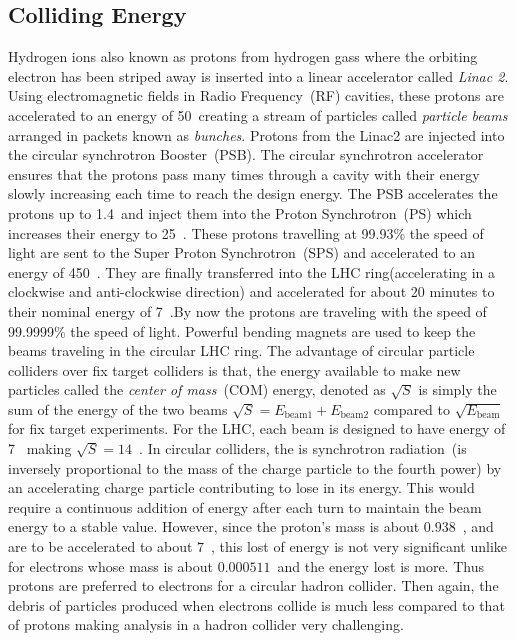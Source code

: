 \subsection{Colliding Energy}
Hydrogen ions also known as protons from hydrogen gass where the orbiting electron has been striped away is inserted into a linear 
accelerator called \textit{Linac 2}.
Using electromagnetic fields in Radio Frequency~(RF) cavities, these protons are accelerated to an energy of 50~\MeV creating a stream of particles called \textit{particle beams} arranged in packets known as \textit{bunches}.
Protons from the Linac2 are injected into the circular synchrotron Booster~(PSB).
The circular synchrotron accelerator ensures that the protons pass many times through a cavity with their energy slowly increasing each time to reach the design energy.
The PSB accelerates the protons up to 1.4~\GeV and inject them into the Proton Synchrotron~(PS) which increases their energy to 25~\GeV. These protons travelling at 99.93\% the speed of light are sent to the Super Proton Synchrotron~(SPS) and accelerated to an energy of 450~\GeV. They are finally transferred into the LHC ring(accelerating in a clockwise and anti-clockwise direction) and accelerated for about 20 minutes to their nominal energy of 7~\TeV.By now the protons are traveling with the speed of 99.9999\% the speed of light.
Powerful bending magnets are used to keep the beams traveling in the circular LHC ring. The advantage of circular particle colliders  over fix target colliders is that, the energy available to make new particles called the \textit{center of mass}~(COM) energy, denoted as $\sqrt{S}$ is simply the sum of the energy of the two beams \ie $\sqrt{S} = \mathit{E}_{\mbox{beam1}} + \mathit{E}_{\mbox{beam2}}$ compared to $\sqrt{\mathit{E}_{\mbox{beam}}}$ for fix target experiments. For the LHC, each beam is designed to have energy of 7~\TeV 
making $\sqrt{S} = 14$~\TeV. In circular colliders, the is synchrotron radiation~(is inversely proportional to the mass of the charge particle to the fourth power) by an accelerating charge particle contributing to lose in its energy. This would require a continuous addition of energy after each turn to maintain the beam energy to a stable value. However, since the proton's mass is  about $0.938$~\GeV, and are to be accelerated to about $7$~\TeV, this lost of energy is not very significant unlike for electrons whose mass is about $0.000511$~\GeV and the energy lost is  more. Thus protons are preferred to electrons for a circular hadron collider.
Then again, the debris of particles produced when electrons collide is much less compared to that of protons making analysis in a hadron collider very challenging. 
